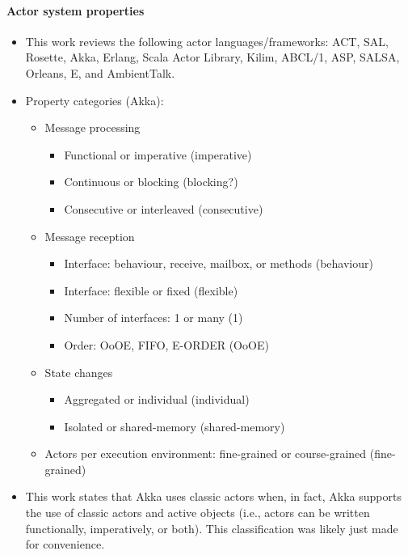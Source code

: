 \paragraph{Actor system properties}
\begin{itemize}
\item This work reviews the following actor languages/frameworks: ACT, SAL, Rosette, Akka, Erlang, Scala Actor Library, Kilim, ABCL/1, ASP, SALSA, Orleans, E, and AmbientTalk.
\item Property categories (Akka):
	\begin{itemize}
	\item Message processing
		\begin{itemize}
		\item Functional or imperative (imperative)
		\item Continuous or blocking (blocking?)
		\item Consecutive or interleaved (consecutive)
		\end{itemize}
	\item Message reception
		\begin{itemize}
		\item Interface: behaviour, receive, mailbox, or methods (behaviour)
		\item Interface: flexible or fixed (flexible)
		\item Number of interfaces: 1 or many (1)
		\item Order: OoOE, FIFO, E-ORDER (OoOE)
		\end{itemize}
	\item State changes
		\begin{itemize}
		\item Aggregated or individual (individual)
		\item Isolated or shared-memory (shared-memory)
		\end{itemize}
	\item Actors per execution environment: fine-grained or course-grained (fine-grained)
	\end{itemize}
\item This work states that Akka uses classic actors when, in fact, Akka supports the use of classic actors and active objects (i.e., actors can be written functionally, imperatively, or both). This classification was likely just made for convenience.
\end{itemize}